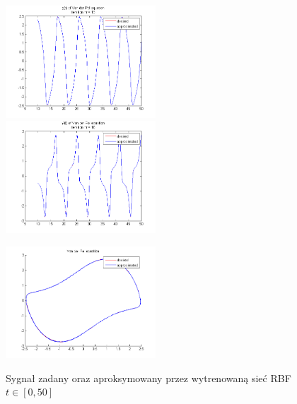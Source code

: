 \begin{figure}[ht!]
	\centering

	\subfloat
	{\includegraphics[width=0.5\textwidth]
	{images/signal_approx.png}}
	\subfloat
	{\includegraphics[width=0.5\textwidth]
	{images/deriv_approx.png}}	
	
	\subfloat
	{\includegraphics[width=0.5\textwidth]
	{images/trajectory_approx.png}}

	\caption{Sygnał zadany oraz aproksymowany przez wytrenowaną sieć RBF $t \in [0,50]$}
	\label{img:approximated}
\end{figure}


